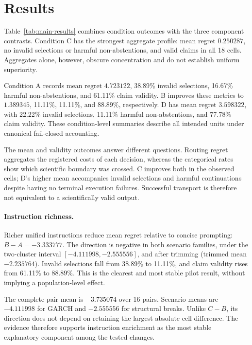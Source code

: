 \section{Results}
\label{sec:results}

Table~\ref{tab:main-results} combines condition outcomes with the three
component contrasts.  Condition C has the strongest aggregate profile:
mean regret \(0.250287\), no invalid selections or harmful non-abstentions,
and valid claims in all 18 cells.  Aggregates alone, however, obscure
concentration and do not establish uniform superiority.

Condition A records mean regret \(4.723122\), 38.89\% invalid selections,
16.67\% harmful non-abstentions, and 61.11\% claim validity.  B improves these
metrics to \(1.389345\), 11.11\%, 11.11\%, and 88.89\%, respectively.  D has
mean regret \(3.598322\), with 22.22\% invalid selections, 11.11\% harmful
non-abstentions, and 77.78\% claim validity.  These condition-level summaries
describe all intended units under canonical fail-closed accounting.

The mean and validity outcomes answer different questions.  Routing regret
aggregates the registered costs of each decision, whereas the categorical
rates show which scientific boundary was crossed.  C improves both in the
observed cells; D's higher mean accompanies invalid selections and harmful
continuations despite having no terminal execution failures.  Successful
transport is therefore not equivalent to a scientifically valid output.



\paragraph{Instruction richness.}
Richer unified instructions reduce mean regret relative to concise prompting:
\(B-A=-3.333777\).  The direction is negative in both scenario families,
under the two-cluster interval \([-4.111998,-2.555556]\), and after trimming
(trimmed mean \(-2.235764\)).  Invalid selections fall from 38.89\% to
11.11\%, and claim validity rises from 61.11\% to 88.89\%.  This is the
clearest and most stable pilot result, without implying a population-level
effect.

The complete-pair mean is \(-3.735074\) over 16 pairs.  Scenario means are
\(-4.111998\) for GARCH and \(-2.555556\) for structural breaks.  Unlike
\(C-B\), its direction does not depend on retaining the largest absolute cell
difference.  The evidence therefore supports instruction enrichment as the
most stable explanatory component among the tested changes.

